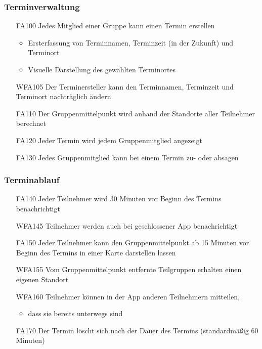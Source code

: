 \documentclass{scrartcl}
\begin{document}
	\subsubsection{Terminverwaltung}
	\begin{itemize}
		\item[FA100] Jedes Mitglied einer Gruppe kann einen Termin erstellen
		\begin{itemize}
			\item Ersterfassung von Terminnamen, Terminzeit (in der Zukunft) und Terminort
			\item Visuelle Darstellung des gewählten Terminortes
		\end{itemize}
		\item[WFA105] Der Terminersteller kann den Terminnamen, Terminzeit und Terminort nachträglich ändern
		\item[FA110] Der Gruppenmittelpunkt wird anhand der Standorte aller Teilnehmer berechnet		
		\item[FA120] Jeder Termin wird jedem Gruppenmitglied angezeigt
		\item[FA130] Jedes Gruppenmitglied kann bei einem Termin zu- oder absagen
		
	\end{itemize}
	
	\subsubsection{Terminablauf}
	\begin{itemize}
		\item[FA140] Jeder Teilnehmer wird 30 Minuten vor Beginn des Termins benachrichtigt
		\item[WFA145] Teilnehmer werden auch bei geschlossener App benachrichtigt
		\item[FA150] Jeder Teilnehmer kann den Gruppenmittelpunkt ab 15 Minuten vor Beginn des Termins in einer Karte darstellen lassen
		\item[WFA155] Vom Gruppenmittelpunkt entfernte Teilgruppen  erhalten einen eigenen Standort 
	\item[WFA160] Teilnehmer können in der App anderen Teilnehmern mitteilen,
	\begin{itemize}
				\item dass sie bereits unterwegs sind
	\end{itemize}
		\item[FA170] Der Termin löscht sich nach der Dauer des Termins (standardmäßig 60 Minuten)
	\end{itemize}
		
\end{document}
